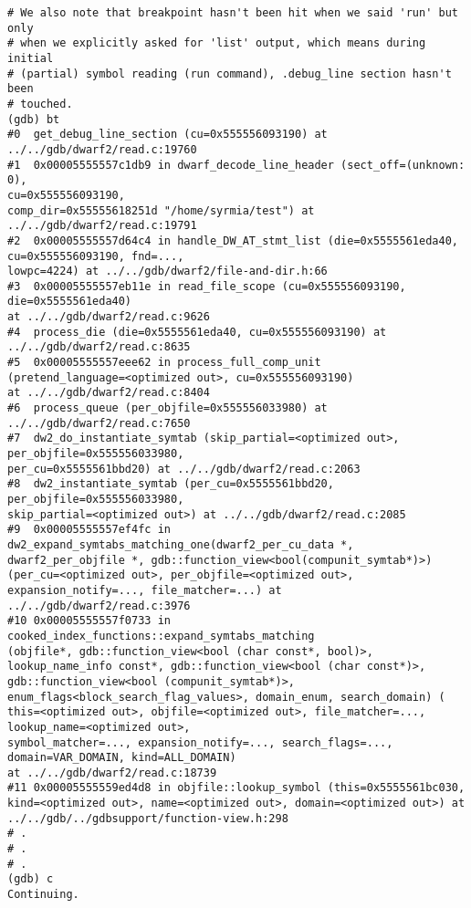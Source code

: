 \documentclass{report}
\begin{document}
\begin{verbatim}
# We also note that breakpoint hasn't been hit when we said 'run' but only
# when we explicitly asked for 'list' output, which means during initial 
# (partial) symbol reading (run command), .debug_line section hasn't been 
# touched.
(gdb) bt
#0  get_debug_line_section (cu=0x555556093190) at 
../../gdb/dwarf2/read.c:19760
#1  0x00005555557c1db9 in dwarf_decode_line_header (sect_off=(unknown: 0), 
cu=0x555556093190, 
comp_dir=0x55555618251d "/home/syrmia/test") at 
../../gdb/dwarf2/read.c:19791
#2  0x00005555557d64c4 in handle_DW_AT_stmt_list (die=0x5555561eda40, 
cu=0x555556093190, fnd=..., 
lowpc=4224) at ../../gdb/dwarf2/file-and-dir.h:66
#3  0x00005555557eb11e in read_file_scope (cu=0x555556093190, 
die=0x5555561eda40)
at ../../gdb/dwarf2/read.c:9626
#4  process_die (die=0x5555561eda40, cu=0x555556093190) at 
../../gdb/dwarf2/read.c:8635
#5  0x00005555557eee62 in process_full_comp_unit 
(pretend_language=<optimized out>, cu=0x555556093190)
at ../../gdb/dwarf2/read.c:8404
#6  process_queue (per_objfile=0x555556033980) at ../../gdb/dwarf2/read.c:7650
#7  dw2_do_instantiate_symtab (skip_partial=<optimized out>, 
per_objfile=0x555556033980, 
per_cu=0x5555561bbd20) at ../../gdb/dwarf2/read.c:2063
#8  dw2_instantiate_symtab (per_cu=0x5555561bbd20, per_objfile=0x555556033980, 
skip_partial=<optimized out>) at ../../gdb/dwarf2/read.c:2085
#9  0x00005555557ef4fc in dw2_expand_symtabs_matching_one(dwarf2_per_cu_data *,
dwarf2_per_objfile *, gdb::function_view<bool(compunit_symtab*)>) 
(per_cu=<optimized out>, per_objfile=<optimized out>, 
expansion_notify=..., file_matcher=...) at ../../gdb/dwarf2/read.c:3976
#10 0x00005555557f0733 in cooked_index_functions::expand_symtabs_matching
(objfile*, gdb::function_view<bool (char const*, bool)>, 
lookup_name_info const*, gdb::function_view<bool (char const*)>, 
gdb::function_view<bool (compunit_symtab*)>, 
enum_flags<block_search_flag_values>, domain_enum, search_domain) (
this=<optimized out>, objfile=<optimized out>, file_matcher=...,
lookup_name=<optimized out>, 
symbol_matcher=..., expansion_notify=..., search_flags=..., 
domain=VAR_DOMAIN, kind=ALL_DOMAIN)
at ../../gdb/dwarf2/read.c:18739
#11 0x00005555559ed4d8 in objfile::lookup_symbol (this=0x5555561bc030, 
kind=<optimized out>, name=<optimized out>, domain=<optimized out>) at 
../../gdb/../gdbsupport/function-view.h:298
# .
# .
# .
(gdb) c
Continuing.


\end{verbatim}
\end{document}
